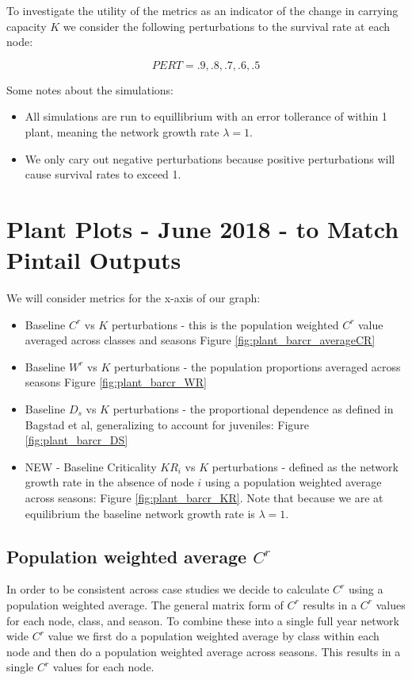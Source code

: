 \documentclass[10pt]{article}
\begin{document}
To investigate the utility of the metrics as an indicator of the change in carrying capacity $K$ we consider the following perturbations to the survival rate at each node:

\[PERT = .9, .8, .7, .6, .5\]

Some notes about the simulations:
\begin{itemize}
\item All simulations are run to equillibrium with an error tollerance of within 1 plant, meaning the network growth rate $\lambda=1$.
\item We only cary out negative perturbations because positive perturbations will cause survival rates to exceed 1.
\end{itemize}
%  


\newpage 



\section{Plant Plots - June 2018 - to Match Pintail Outputs}

We will consider metrics for the x-axis of our graph:
\begin{itemize}
\item Baseline $C^r$ vs $K$ perturbations - this is the population weighted $C^r$ value averaged across classes and seasons Figure \ref{fig:plant_barcr_averageCR}
\item Baseline $W^r$ vs $K$ perturbations - the population proportions averaged across seasons Figure \ref{fig:plant_barcr_WR}
\item Baseline $D_s$ vs $K$ perturbations - the proportional dependence as defined in Bagstad et al, generalizing to account for juveniles: Figure \ref{fig:plant_barcr_DS}
\item NEW - Baseline Criticality $KR_i$ vs $K$ perturbations - defined as the network growth rate in the absence of node $i$ using a population weighted average across seasons: Figure \ref{fig:plant_barcr_KR}. Note that because we are at equilibrium the baseline network growth rate is $\lambda = 1$.
\end{itemize}

\newpage
\subsection{Population weighted average \texorpdfstring{$C^r$}{CR}}

In order to be consistent across case studies we decide to calculate $C^r$ using a population weighted average. The general matrix form of $C^r$ results in a $C^r$ values for each node, class, and season. To combine these into a single full year network wide $C^r$ value we first do a population weighted average by class within each node and then do a population weighted average across seasons. This results in a single $C^r$ values for each node.
\end{document}
